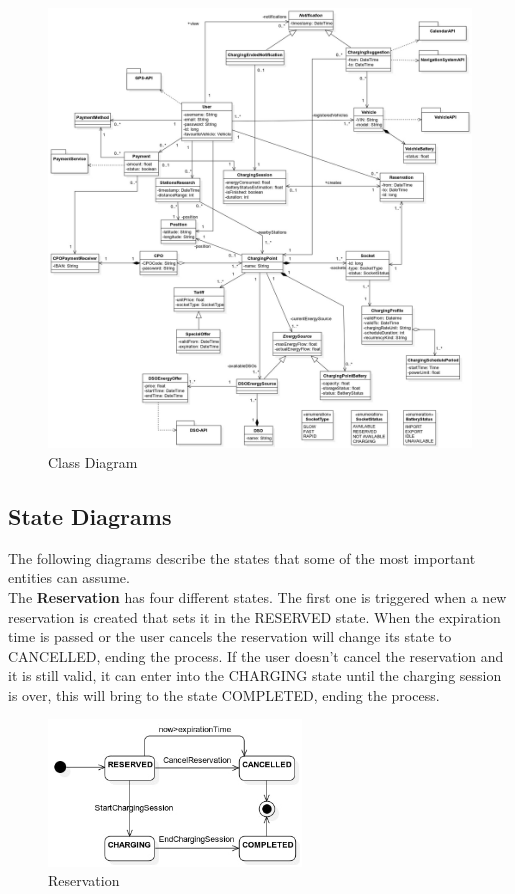\documentclass{Configuration_Files/PoliMi3i_thesis}
\begin{document}
\begin{figure}[H]
    \centering
    \includegraphics[width=1\textwidth]{Images/ClassDiagram.jpg}
    \caption{Class Diagram}
\end{figure}

\subsection{State Diagrams}
The following diagrams describe the states that some of the most important entities can assume.\\

The \textbf{Reservation} has four different states. The first one is triggered when a new reservation is created that sets it in the RESERVED state. When the expiration time is passed or the user cancels the reservation will change its state to CANCELLED, ending the process. If the user doesn't cancel the reservation and it is still valid, it can enter into the CHARGING state until the charging session is over, this will bring to the state COMPLETED, ending the process.
\begin{figure}[H]
    \centering
    \includegraphics[width=0.6\textwidth]{Images/StateDiagrams/Reservation.jpg}
    \caption{Reservation}
\end{figure}
\end{document}
